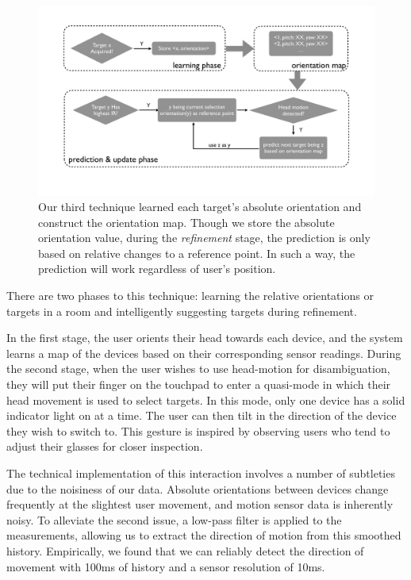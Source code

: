 \begin{figure}[t]
\centering
\includegraphics[width=1\columnwidth]{figures/third_technique.pdf}
\caption{ Our third technique learned each target's absolute orientation and construct the orientation map. Though we store the absolute orientation value, during the {\em refinement} stage, the prediction is only based on relative changes to a reference point. In such a way, the prediction will work regardless of user's position.}
\label{fig:third_technique}
\end{figure}

There are two phases to this technique: learning the relative orientations or targets in a room and intelligently suggesting targets during refinement.

In the first stage, the user orients their head towards each device, and the system learns a map of the devices based on their corresponding sensor readings. During the second stage, when the user wishes to use head-motion for disambiguation, they will put their finger on the touchpad to enter a quasi-mode in which their head movement is used to select targets. In this mode, only one device has a solid indicator light on at a time.   The user can then tilt in the direction of the device they wish to switch to. This gesture is inspired by observing users who tend to adjust their glasses for closer inspection.

The technical implementation of this interaction involves a number of subtleties due to the noisiness of our data. Absolute orientations between devices change frequently at the slightest user movement, and motion sensor data is inherently noisy. To alleviate the second issue, a low-pass filter is applied to the measurements, allowing us to extract the direction of motion from this smoothed history. Empirically, we found that we can reliably detect the direction of movement with 100ms of history and a sensor resolution of 10ms.

